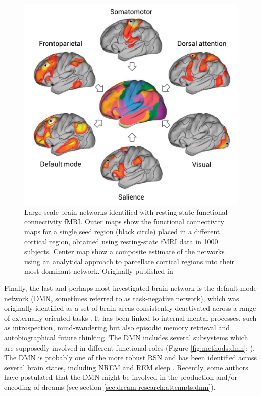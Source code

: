 \begin{figure}[htb]
	\includegraphics[width=\textwidth]{Fig/Methods/fMRI_Networks/fMRI_Networks.png}
	\caption[Large-scale brain networks]{Large-scale brain networks identified with resting-state functional connectivity fMRI. Outer maps show the functional connectivity maps for a single seed region (black circle) placed in a different cortical region, obtained using resting-state fMRI data in 1000 subjects. Center map show a composite estimate of the networks using an analytical approach to parcellate cortical regions into their most dominant network. Originally published in \citet{buckner_opportunities_2013}}
	\label{fig:methods:networks}
\end{figure}

Finally, the last and perhaps most investigated brain network is the default mode network (DMN, sometimes referred to as task-negative network), which was originally identified as a set of brain areas consistently deactivated across a range of externally oriented tasks \citep{raichle_default_2001}. It has been linked to internal mental processes, such as introspection, mind-wandering but also episodic memory retrieval and autobiographical future thinking. The DMN includes several subsystems which are supposedly involved in different functional roles  (Figure \ref{fig:methods:dmn}; \citealp{andrews-hanna_functional-anatomic_2010}). The DMN is probably one of the more robust RSN and has been identified across several brain states, including NREM and REM sleep \citep{horovitz_decoupling_2009, larson-prior_cortical_2009, larson-prior_modulation_2011, wu_variations_2012}. Recently, some authors have postulated that the DMN might be involved in the production and/or encoding of dreams (see section \ref{sec:dream-research:attempts:dmn}).

